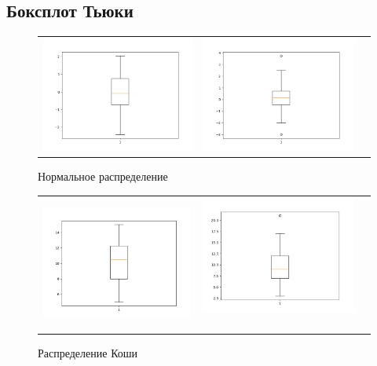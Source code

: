 \subsection{Боксплот Тьюки}
	\begin{figure}[H]
		\centering
		\begin{tabular}{ccc}
			\includegraphics[width=55mm, height =0.25\textheight]{pics/n20.png}
			&
			\includegraphics[width=55mm, height =0.25\textheight]{pics/n100.png}
		\end{tabular}
		\caption{Нормальное распределение}
		\label{fig:normal}
	\end{figure}

	\begin{figure}[H]
		\centering
		\begin{tabular}{ccc}
			\includegraphics[width=55mm, height =0.25\textheight]{pics/c20.png}
			&
			\includegraphics[width=55mm, height =0.25\textheight]{pics/c100.png}\
		\end{tabular}
		\caption{Распределение Коши}
		\label{fig:cauchy}
	\end{figure}
	

